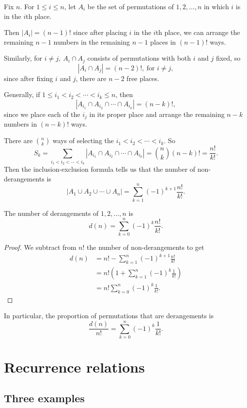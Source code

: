\documentclass[10pt, a4paper]{article}
\begin{document}
Fix $n$.
For $1 \leq i \leq n$,
let $A_i$ be the set of permutations of $1, 2, \dotsc, n$ in which $i$ is in the $i$th place.

Then $|A_i| = (n - 1)!$ since after placing $i$ in the $i$th place,
we can arrange the remaining $n - 1$ numbers in the remaining $n - 1$ places in $(n - 1)!$ ways.

Similarly, for $i \neq j,\ A_i \cap A_j$ consists of permutations with both $i$ and $j$ fixed, so
\[
|A_i \cap A_j| = (n - 2)!,\ \text{for } i \neq j,
\]
since after fixing $i$ and $j$,
there are $n - 2$ free places.

Generally, if $1 \leq i_1 < i_2 < \dotsi < i_k \leq n$, then
\[
|A_{i_1} \cap A_{i_2} \cap \dotsi \cap A_{i_k}| = (n - k)!,
\]
since we place each of the $i_j$ in its proper place and arrange the remaining $n - k$ numbers in $(n - k)!$ ways.

There are $\binom{n}{k}$ ways of selecting the $i_1 < i_2 < \dotsi < i_k$.
So
\[
S_k = \sum_{i_1 < i_2 < \dotsi < i_k}|A_{i_1} \cap A_{i_2} \cap \dotsi \cap A_{i_k}| = \binom{n}{k}(n - k)! = \frac{n!}{k!}.
\]
Then the inclusion-exclusion formula tells us that the number of non-derangements is
\[
|A_1 \cup A_2 \cup \dotsi \cup A_n| = \sum_{k = 1}^{n}(-1) ^ {k + 1}\frac{n!}{k!}.
\]
\begin{proposition}
    The number of derangements of $1, 2, \dotsc, n$ is
    \[
    d(n) = \sum_{k = 0}^{n}(-1) ^ k\frac{n!}{k!}.
    \]
    \begin{proof}
        We subtract from $n!$ the number of non-derangements to get
        \begin{align*}
            d(n) &= n! - \sum_{k = 1}^{n}(-1) ^ {k + 1}\frac{n!}{k!} \\
            &= n!\left(1 + \sum_{k = 1}^{n}(-1) ^ k \frac{1}{k!}\right) \\
            &= n!\sum_{k = 0}^{n}(-1) ^ k\frac{1}{k!}.
        \end{align*}
    \end{proof}
\end{proposition}
In particular, the proportion of permutations that are derangements is
\[
\frac{d(n)}{n!} = \sum_{k = 0}^{n}(-1) ^ k\frac{1}{k!}.
\]

\newpage

\section{Recurrence relations}

\subsection{Three examples}
\end{document}
